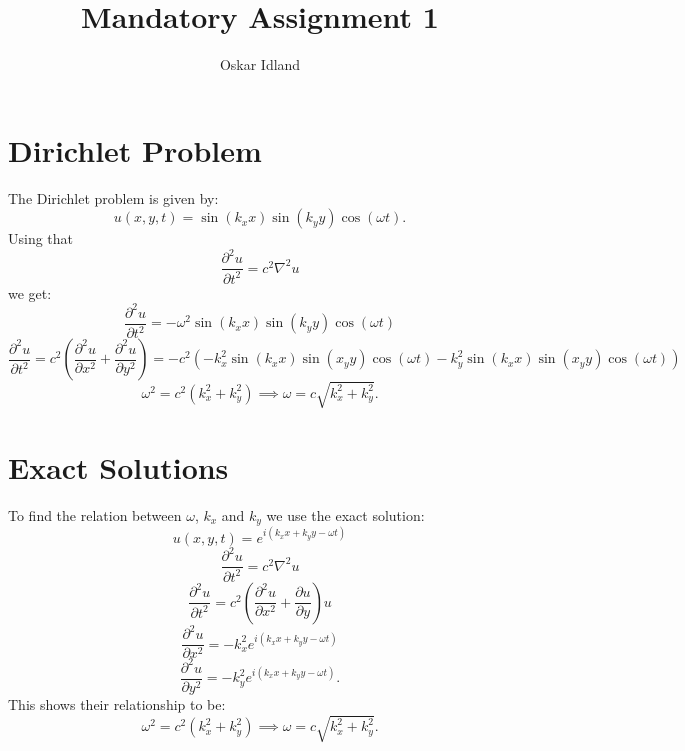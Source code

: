 \documentclass{article}
\author{Oskar Idland}
\title{Mandatory Assignment 1}
\date{}
\begin{document}
\maketitle
\newpage

\section*{Dirichlet Problem}
The Dirichlet problem is given by:
\[
u(x, y, t) = \sin(k_xx) \sin(k_yy) \cos(ωt).
\]
Using that 
\[
\frac{∂^2u}{∂t^2} = c^2∇^2u 
\]
we get:
\[
\frac{∂^2u}{∂t^2} = -ω^2 \sin(k_xx) \sin(k_yy) \cos(ωt)
\]
\[
\frac{∂^2u}{∂t^2} = c^2 \left(\frac{∂^2u}{∂x^2} + \frac{∂^2u}{∂y^2}\right) = -c^2 \left(-k_x^2 \sin (k_xx) \sin(x_yy) \cos(ωt)  -k_y^2 \sin (k_xx) \sin(x_yy) \cos(ωt)\right)
\]
\[
ω^2 = c^2(k_x^2 + k_y^2) ⟹ ω = c\sqrt{k_x^2 + k_y^2}.
\]


\section*{Exact Solutions}
To find the relation between $ω$, $k_x$ and $k_y$ we use the exact solution:
\[
u(x, y, t) = e^{i(k_xx + k_yy - ωt)}
\]
\[
\frac{∂^2u}{∂ t^2} = c^2∇^2u
\]
\[
\frac{∂^2u}{∂t^2} = c^2 \left(\frac{∂^2u}{∂x^2} + \frac{∂u}{∂y}\right)u
\]
\[
\frac{∂^2u}{∂ x^2} = -k_x^2 e^{i(k_xx + k_yy - ωt)}
\]
\[
\frac{∂^2u}{∂ y^2} = -k_y^2 e^{i(k_xx + k_yy - ωt)}.
\]
This shows their relationship to be: 
\[
ω^2 = c^2(k_x^2 + k_y^2) ⟹ ω = c\sqrt{k_x^2 + k_y^2}.
\]
\end{document}

